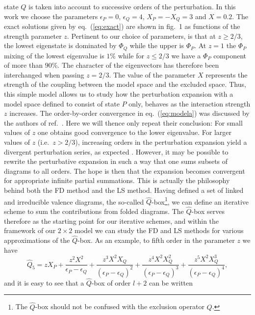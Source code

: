 state $Q$ is taken into account to successive orders of the perturbation.
In this work we choose the parameters $\epsilon_P=0$, $\epsilon_Q=4$,
$X_P=-X_Q=3$ and $X=0.2$. The exact solutions
given by eq.\ (\ref{eq:exact})
are shown in fig.\ 1 as functions of the
strength parameter $z$. Pertinent to our choice of
parameters, is that at $z\geq 2/3$,  the lowest eigenstate is
dominated by $\Phi_Q$ while the upper is $\Phi_P$. At $z=1$ the
$\Phi_P$ mixing of the lowest eigenvalue
is $1\%$ while for $z\leq 2/3$
we have a $\Phi_P$ component of more than $90\%$.
The character of the eigenvectors has therefore been interchanged
when passing $z=2/3$. The value of the parameter $X$ represents the
strength of the coupling between the model space and the excluded space.
Thus, this simple
model allows us to study how the perturbation expansion with a
model space defined to consist of state $P$ only, behaves
as the interaction strength $z$ increases. The order-by-order
convergence in eq.\ (\ref{eq:modela}) was discussed by the authors
of ref.\ \cite{eo77}. Here we will thence only repeat
their conclusion:
For small values of $z$ one obtains
good convergence to the lower eigenvalue. For larger values of $z$ 
(i.e.\ $z> 2/3$),
increasing orders in the perturbation expansion yield a divergent
perturbation series, as expected \cite{sw72}.
However, it may be possible to rewrite
the perturbative expansion in such a way that one sums
subsets of diagrams to all orders. The hope is then that the
expansion becomes convergent for appropriate infinite partial
summations.
This is actually the philosophy
behind both the FD method and the LS method. Having defined
a set of linked and irreducible valence diagrams,
the so-called $\hat{Q}$-box\footnote{
The $\hat{Q}$-box should not be confused with the exclusion
operator $Q$.}, we can define an
iterative scheme to sum the contributions
from folded diagrams.
The $\hat{Q}$-box serves therefore as the starting point
for our iterative schemes, and within the framework of our
$2\times 2$ model we can
study the FD and LS methods for various
approximations of the $\hat{Q}$-box.
As an example, to fifth order in the parameter $z$ we have
\begin{equation}
       \hat{Q}_5=zX_P+\frac{z^2X^2}{\epsilon_P -\epsilon_Q}+
       \frac{z^3X^2X_Q}{(\epsilon_P -\epsilon_Q)^2}+
       \frac{z^4X^2X_Q^2}{(\epsilon_P -\epsilon_Q)^3}+
        \frac{z^5X^2X_Q^3}{(\epsilon_P -\epsilon_Q)^4},
       \label{eq:qapprox}
\end{equation}
and it
is easy to see that a $\hat{Q}$-box of order $l+2$ can be written
